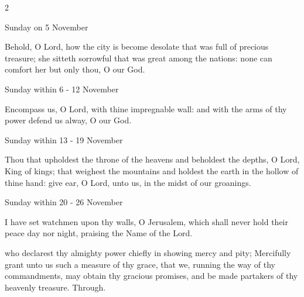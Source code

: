 \begin{multicols}{2}
\begin{inhead}
Sunday on 5 November
\end{inhead}\par\noindent
Behold, O Lord, {\dag} how the city is become desolate that was full of precious treasure; she sitteth sorrowful that was great among the nations: none can comfort her but only thou, O our God.

\newcolumn

\begin{inhead}
Sunday within 6 - 12 November
\end{inhead}\par\noindent
Encompass us, {\dag} O Lord, with thine impregnable wall: and with the arms of thy power defend us alway, O our God.

\begin{inhead}
Sunday within 13 - 19 November
\end{inhead}\par\noindent
Thou that upholdest {\dag} the throne of the heavens and beholdest the depths, O Lord, King of kings; that weighest the mountains and holdest the earth in the hollow of thine hand: give ear, O Lord, unto us, in the midst of our groanings.

\begin{inhead}
Sunday within 20 - 26 November
\end{inhead}\par\noindent
I have set watchmen {\dag} upon thy walls, O Jerusalem, which shall never hold their peace day nor night, praising the Name of the Lord.
\end{multicols}





\collect
{} who declarest thy almighty power chiefly in showing mercy and pity; Mercifully grant unto us such a measure of thy grace, that we, running the way of thy commandments, may obtain thy gracious promises, and be made partakers of thy heavenly treasure. Through.


